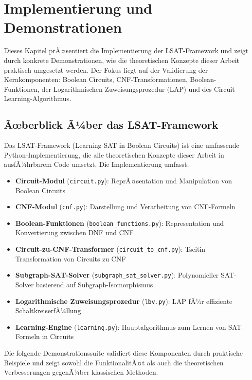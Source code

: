 ﻿\documentclass[a4paper,12pt]{article}
\theoremstyle{definition}
\begin{document}
\section{Implementierung und Demonstrationen}

Dieses Kapitel prÃ¤sentiert die Implementierung der LSAT-Framework und zeigt durch konkrete Demonstrationen, wie die theoretischen Konzepte dieser Arbeit praktisch umgesetzt werden. Der Fokus liegt auf der Validierung der Kernkomponenten: Boolean Circuits, CNF-Transformationen, Boolean-Funktionen, der Logarithmischen Zuweisungsprozedur (LAP) und des Circuit-Learning-Algorithmus.

\subsection{Ãœberblick Ã¼ber das LSAT-Framework}

Das LSAT-Framework (Learning SAT in Boolean Circuits) ist eine umfassende Python-Implementierung, die alle theoretischen Konzepte dieser Arbeit in ausfÃ¼hrbarem Code umsetzt. Die Implementierung umfasst:

\begin{itemize}
    \item \textbf{Circuit-Modul} (\texttt{circuit.py}): ReprÃ¤sentation und Manipulation von Boolean Circuits
    \item \textbf{CNF-Modul} (\texttt{cnf.py}): Darstellung und Verarbeitung von CNF-Formeln
    \item \textbf{Boolean-Funktionen} (\texttt{boolean\_functions.py}): Representation und Konvertierung zwischen DNF und CNF
    \item \textbf{Circuit-zu-CNF-Transformer} (\texttt{circuit\_to\_cnf.py}): Tseitin-Transformation von Circuits zu CNF
    \item \textbf{Subgraph-SAT-Solver} (\texttt{subgraph\_sat\_solver.py}): Polynomieller SAT-Solver basierend auf Subgraph-Isomorphismus
    \item \textbf{Logarithmische Zuweisungsprozedur} (\texttt{lbv.py}): LAP fÃ¼r effiziente SchaltkreiserfÃ¼llung
    \item \textbf{Learning-Engine} (\texttt{learning.py}): Hauptalgorithmus zum Lernen von SAT-Formeln in Circuits
\end{itemize}

Die folgende Demonstrationssuite validiert diese Komponenten durch praktische Beispiele und zeigt sowohl die FunktionalitÃ¤t als auch die theoretischen Verbesserungen gegenÃ¼ber klassischen Methoden.
\end{document}
